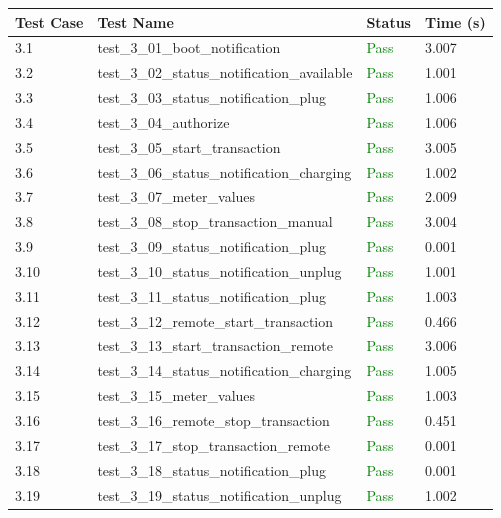 \documentclass{article}
\begin{document}
\begin{longtable}{p{} p{} p{} p{}}
\toprule
\textbf{Test Case} & \textbf{Test Name} & \textbf{Status} & \textbf{Time (s)} \\
\midrule
\endhead
3.1 & test\_3\_01\_boot\_notification & \textcolor{green}{Pass} & 3.007 \\
3.2 & test\_3\_02\_status\_notification\_available & \textcolor{green}{Pass} & 1.001 \\
3.3 & test\_3\_03\_status\_notification\_plug & \textcolor{green}{Pass} & 1.006 \\
3.4 & test\_3\_04\_authorize & \textcolor{green}{Pass} & 1.006 \\
3.5 & test\_3\_05\_start\_transaction & \textcolor{green}{Pass} & 3.005 \\
3.6 & test\_3\_06\_status\_notification\_charging & \textcolor{green}{Pass} & 1.002 \\
3.7 & test\_3\_07\_meter\_values & \textcolor{green}{Pass} & 2.009 \\
3.8 & test\_3\_08\_stop\_transaction\_manual & \textcolor{green}{Pass} & 3.004 \\
3.9 & test\_3\_09\_status\_notification\_plug & \textcolor{green}{Pass} & 0.001 \\
3.10 & test\_3\_10\_status\_notification\_unplug & \textcolor{green}{Pass} & 1.001 \\
3.11 & test\_3\_11\_status\_notification\_plug & \textcolor{green}{Pass} & 1.003 \\
3.12 & test\_3\_12\_remote\_start\_transaction & \textcolor{green}{Pass} & 0.466 \\
3.13 & test\_3\_13\_start\_transaction\_remote & \textcolor{green}{Pass} & 3.006 \\
3.14 & test\_3\_14\_status\_notification\_charging & \textcolor{green}{Pass} & 1.005 \\
3.15 & test\_3\_15\_meter\_values & \textcolor{green}{Pass} & 1.003 \\
3.16 & test\_3\_16\_remote\_stop\_transaction & \textcolor{green}{Pass} & 0.451 \\
3.17 & test\_3\_17\_stop\_transaction\_remote & \textcolor{green}{Pass} & 0.001 \\
3.18 & test\_3\_18\_status\_notification\_plug & \textcolor{green}{Pass} & 0.001 \\
3.19 & test\_3\_19\_status\_notification\_unplug & \textcolor{green}{Pass} & 1.002 \\
\bottomrule
\end{longtable}
\end{document}

